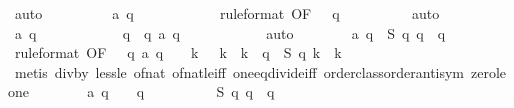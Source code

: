\begin{isabellebody}
\ auto\isanewline
\ \ \ \ \ \ \isamarkupfalse%
\ \isamarkupfalse%
\ {\isachardoublequoteopen}a\ q\ {\isasymle}\ {}{\isachardoublequoteclose}\isanewline
\ \ \ \ \ \ \ \ \isamarkupfalse%
\ {\isacharasterisk}{\isacharbrackleft}rule{\isacharunderscore}format{\isacharcomma}\ OF\ {\isacharbackquoteopen}{}\ {\isasymle}\ q{\isacharbackquoteclose}{\isacharbrackright}\isanewline
\ \ \ \ \ \ \ \ \isamarkupfalse%
\ auto\isanewline
\ \ \ \ \ \ \isamarkupfalse%
\ \isamarkupfalse%
\ {\isachardoublequoteopen}a\ q\ {\isacharless}\ {}{\isachardoublequoteclose}\isanewline
\ \ \ \ \ \ \ \ \isamarkupfalse%
\ {\isacharbackquoteopen}q\ {\isacharequal}\ {\isacharquery}q{\isacharbackquoteclose}\ {\isacharbackquoteopen}a\ {\isacharquery}q\ {\isasymnoteq}\ {}{\isacharbackquoteclose}\isanewline
\ \ \ \ \ \ \ \ \isamarkupfalse%
\ auto\isanewline
\isanewline
\ \ \ \ \ \ \isamarkupfalse%
\ {\isachardoublequoteopen}a\ q\ {\isacharequal}\ {\isacharquery}S\ q\ q\ {\isacharslash}\ q{\isachardoublequoteclose}\isanewline
\ \ \ \ \ \ \ \ \isamarkupfalse%
\ {\isacharasterisk}{\isacharbrackleft}rule{\isacharunderscore}format{\isacharcomma}\ OF\ {\isacharbackquoteopen}{}\ {\isasymle}\ q{\isacharbackquoteclose}{\isacharbrackright}\ {\isacharbackquoteopen}a\ q\ {\isacharless}\ {}{\isacharbackquoteclose}\ {\isacharbackquoteopen}{\isasymforall}\ k{\isachardot}\ {}\ {\isasymle}\ k\ {\isasymand}\ k\ {\isacharless}\ q\ {\isasymlongrightarrow}\ {\isacharquery}S\ q\ k\ {\isacharequal}\ k{\isacharbackquoteclose}\isanewline
\ \ \ \ \ \ \ \ \isamarkupfalse%
\ {\isacharparenleft}metis\ div{\isacharunderscore}by{\isacharunderscore}{}\ less{\isacharunderscore}le\ of{\isacharunderscore}nat{\isacharunderscore}{}\ of{\isacharunderscore}nat{\isacharunderscore}le{\isacharunderscore}iff\ one{\isacharunderscore}eq{\isacharunderscore}divide{\isacharunderscore}iff\ order{\isacharunderscore}class{\isachardot}order{\isachardot}antisym\ zero{\isacharunderscore}le{\isacharunderscore}one{\isacharparenright}\isanewline
\isanewline
\ \ \ \ \ \ \isamarkupfalse%
\ {\isachardoublequoteopen}a\ q\ {\isacharequal}\ {}\ {\isacharminus}\ {}{\isacharslash}q{\isachardoublequoteclose}\isanewline
\ \ \ \ \ \ \ \ \isamarkupfalse%
\ {\isacharbackquoteopen}{\isacharquery}S\ q\ q\ {\isacharequal}\ q\ {\isacharminus}\ {}{\isacharbackquoteclose}\isanewline

\end{isabellebody}
